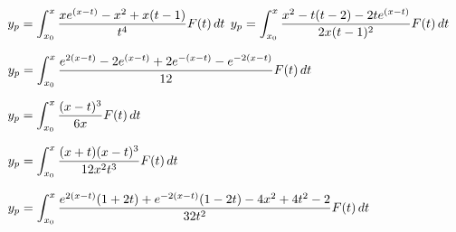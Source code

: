 $y_{p}=\displaystyle{\int_{x_{0}}^{x}\frac{xe^{(x-t)}-x^{2}+x(t-1)}{t^{4}}
F(t)\,dt}$
$y_{p}=\displaystyle{\int_{x_{0}}^{x}\frac{x^{2}-t(t-2)-2te^{(x-t)}}{2x(t-1)^{2}}
F(t)\,dt}$

$y_{p}=\displaystyle{\int_{x_{0}}^{x}
\frac{e^{2(x-t)}-2e^{(x-t)}+2e^{-(x-t)}-e^{-2(x-t)}}{12}F(t)\,dt}$

$y_{p}=\displaystyle{\int_{x_{0}}^{x}\frac{(x-t)^{3}}{6x}
F(t)\,dt}$

$y_{p}=\displaystyle\int_{x_{0}}^{x}\frac{(x+t)(x-t)^{3}}{12x^{2}t^{3}}F(t)\,dt$

$y_{p}=\displaystyle{\int_{x_{0}}^{x}
\frac{e^{2(x-t)}(1+2t)+e^{-2(x-t)}(1-2t)-4x^{2}+4t^{2}-2}{32t^{2}}
F(t)\,dt}$

